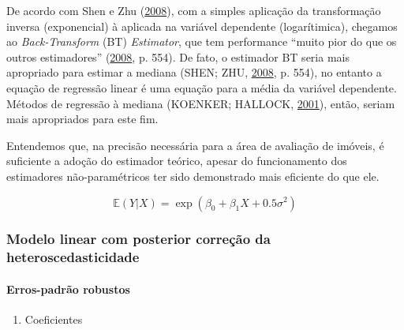 \documentclass[a4paper]{article}
\providecommand{\tightlist}{%
  \setlength{\itemsep}{0pt}\setlength{\parskip}{0pt}}
\let\oldparagraph\paragraph
\renewcommand{\paragraph}[1]{\oldparagraph{#1}\mbox{}}
\begin{document}
De acordo com Shen e Zhu (\protect\hyperlink{ref-shen}{2008}), com a
simples aplicação da transformação inversa (exponencial) à aplicada na
variável dependente (logarítimica), chegamos ao \emph{Back-Transform}
(BT) \emph{Estimator}, que tem performance ``muito pior do que os outros
estimadores'' (\protect\hyperlink{ref-shen}{2008}, p. 554). De fato, o
estimador BT seria mais apropriado para estimar a mediana (SHEN; ZHU,
\protect\hyperlink{ref-shen}{2008}, p. 554), no entanto a equação de
regressão linear é uma equação para a média da variável dependente.
Métodos de regressão à mediana (KOENKER; HALLOCK,
\protect\hyperlink{ref-koenker}{2001}), então, seriam mais apropriados
para este fim.

Entendemos que, na precisão necessária para a área de avaliação de
imóveis, é suficiente a adoção do estimador teórico, apesar do
funcionamento dos estimadores não-paramétricos ter sido demonstrado mais
eficiente do que ele.

\[\mathbb{E}(Y|X) = \exp(\beta_0 + \beta_1X + 0.5\sigma^2)\]

\subsubsection{Modelo linear com posterior correção da
heteroscedasticidade}\label{modelo-linear-com-posterior-correcao-da-heteroscedasticidade}

\paragraph{Erros-padrão robustos}\label{erros-padrao-robustos}

\begin{enumerate}
\def\labelenumi{\alph{enumi}.}
\tightlist
\item
  Coeficientes
\end{enumerate}
\end{document}
